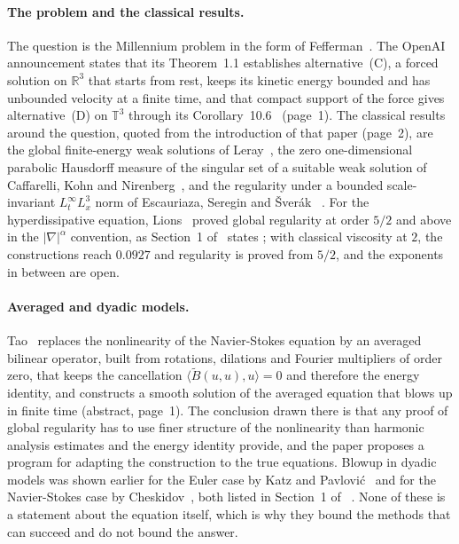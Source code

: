 \documentclass[11pt]{article}
\theoremstyle{remark}
\newcommand{\ev}[1]{\hspace{0.2em}{\small\textsf{[#1]}}}
\begin{document}
\paragraph{The problem and the classical results.} The question is the Millennium problem in the form of
Fefferman~\cite{fefferman}. The OpenAI announcement states that its Theorem~1.1 establishes alternative~(C),
a forced solution on $\mathbb R^{3}$ that starts from rest, keeps its kinetic energy bounded and has
unbounded velocity at a finite time, and that compact support of the force gives alternative~(D) on
$\mathbb T^{3}$ through its Corollary~10.6~\cite{openai-ns} \ev{V} (page~1). The classical results around the
question, quoted from the introduction of that paper (page~2), are the global finite-energy weak solutions of
Leray~\cite{leray}, the zero one-dimensional parabolic Hausdorff measure of the singular set of a suitable weak
solution of Caffarelli, Kohn and Nirenberg~\cite{ckn}, and the regularity under a bounded scale-invariant
$L^{\infty}_{t}L^{3}_{x}$ norm of Escauriaza, Seregin and \v{S}ver\'ak~\cite{ess} \ev{U}. For the
hyperdissipative equation, Lions~\cite{lions} proved global regularity at order $5/2$ and above in the
$|\nabla|^{\alpha}$ convention, as Section~1 of~\cite{cmz} states \ev{U}; with classical viscosity at $2$,
the constructions reach $0.0927$ and regularity is proved from $5/2$, and the exponents in between are open.

\paragraph{Averaged and dyadic models.} Tao~\cite{tao} replaces the nonlinearity of the Navier-Stokes
equation by an averaged bilinear operator, built from rotations, dilations and Fourier multipliers of order
zero, that keeps the cancellation $\langle\widetilde B(u,u),u\rangle=0$ and therefore the energy identity, and
constructs a smooth solution of the averaged equation that blows up in finite time \ev{V} (abstract, page~1).
The conclusion drawn there is that any proof of global regularity has to use finer structure of the
nonlinearity than harmonic analysis estimates and the energy identity provide, and the paper proposes a
program for adapting the construction to the true equations. Blowup in dyadic models was shown earlier for
the Euler case by Katz and Pavlovi\'c~\cite{kp} and for the Navier-Stokes case by Cheskidov~\cite{cheskidov},
both listed in Section~1 of~\cite{cmz} \ev{U}. None of these is a statement about the equation itself, which
is why they bound the methods that can succeed and do not bound the answer.
\end{document}
